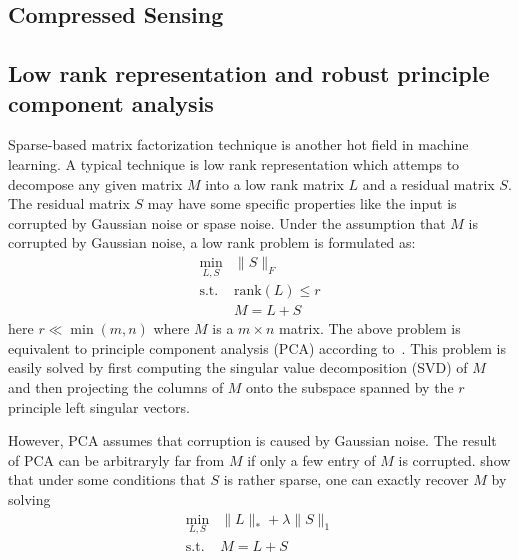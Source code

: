 \subsection{Compressed Sensing}

\subsection{Low rank representation and robust principle component analysis}
Sparse-based matrix factorization technique is another hot field in machine learning.
A typical technique is low rank representation which attemps to decompose any given matrix $M$ into a low rank matrix $L$ and a residual matrix $S$.
The residual matrix $S$ may have some specific properties like the input is corrupted by Gaussian noise or spase noise.
Under the assumption that $M$ is corrupted by Gaussian noise, a low rank problem is formulated as:
\begin{equation}
\label{eq-lowrank}
\begin{array}{cl}
\min_{L,S} & \|S\|_F\\
\mathrm{s.t.} & \mathrm{rank}(L)\leq r\\
&M=L+S
\end{array}
\end{equation}
here $r\ll \min(m,n)$ where $M$ is a $m\times n$ matrix.
The above problem is equivalent to principle component analysis (PCA) according to~\cite{jolliffe2005principal,wold1987principal}.
This problem is easily solved by first computing the singular value decomposition (SVD) of $M$ and then projecting the columns of $M$ onto the subspace spanned by the $r$ principle left singular vectors.

However, PCA assumes that corruption is caused by Gaussian noise.
The result of PCA can be arbitraryly far from $M$ if only a few entry of $M$ is corrupted.
\cite{wright2009robust,candes2011robust} show that under some conditions that $S$ is rather sparse, one can exactly recover $M$ by solving
\begin{equation}
\label{eq-lowranksparse}
\begin{array}{cl}
\min_{L,S} & \|L\|_* + \lambda \|S\|_1 \\
\mathrm{s.t.} & M = L+S
\end{array}
\end{equation}

